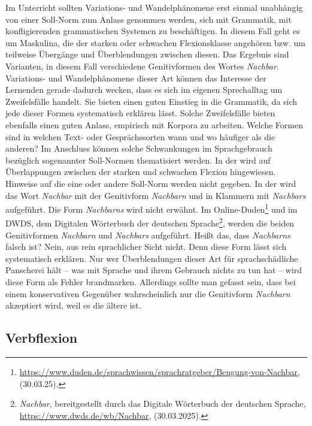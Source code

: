 Im Unterricht sollten Variations- und Wandelphänomene erst einmal unabhängig von einer Soll-Norm zum Anlass genommen werden, sich mit Grammatik, mit konfligierenden grammatischen Systemen zu beschäftigen. In diesem Fall geht es um Maskulina, die der starken oder schwachen Flexionsklasse angehören bzw. um teilweise Übergänge und Überblendungen zwischen diesen. Das Ergebnis sind Varianten, in diesem Fall verschiedene Genitivformen des Wortes \textit{Nachbar}. Variations- und Wandelphänomene dieser Art können das Interesse der Lernenden gerade dadurch wecken, dass es sich im eigenen Sprechalltag um Zweifelsfälle handelt. Sie bieten einen guten Einstieg in die Grammatik, da sich jede dieser Formen systematisch erklären lässt. Solche Zweifelsfälle bieten ebenfalls einen guten Anlass, empirisch mit Korpora zu arbeiten. Welche Formen sind in welchen Text- oder Gesprächssorten wann und wo häufiger als die anderen? Im Anschluss können solche Schwankungen im Sprachgebrauch bezüglich sogenannter Soll-Normen thematisiert werden.    
In der \citet[718, §1247]{Duden2022} wird auf Überlappungen zwischen der starken und schwachen Flexion hingewiesen. Hinweise auf die eine oder andere Soll-Norm werden nicht gegeben. In der \citet[237]{Duden2016} wird das Wort \textit{Nachbar} mit der Genitivform \textit{Nachbarn} und in Klammern mit \textit{Nachbars} aufgeführt. Die Form \textit{Nachbarns} wird nicht erwähnt. Im Online-Duden\footnote{\url{https://www.duden.de/sprachwissen/sprachratgeber/Beugung-von-Nachbar}, (30.03.25).} und im DWDS, dem Digitalen Wörterbuch der deutschen Sprache\footnote{\textit{Nachbar}, bereitgestellt durch das Digitale Wörterbuch der deutschen Sprache, \url{https://www.dwds.de/wb/Nachbar}, (30.03.2025).}, werden die beiden Genitivformen \textit{Nachbarn} und \textit{Nachbars} aufgeführt. Heißt das, dass \textit{Nachbarns} falsch ist? Nein, aus rein sprachlicher Sicht nicht. Denn diese Form lässt sich systematisch erklären. Nur wer Überblendungen dieser Art für sprachschädliche Panscherei hält -- was mit Sprache und ihrem Gebrauch nichts zu tun hat -- wird diese Form als Fehler brandmarken. Allerdings sollte man gefasst sein, dass bei einem konservativen Gegenüber wahrscheinlich nur die Genitivform \textit{Nachbarn} akzeptiert wird, weil es die ältere ist.
 

\subsection{Verbflexion}\label{subsection:A_Verbflexion}

